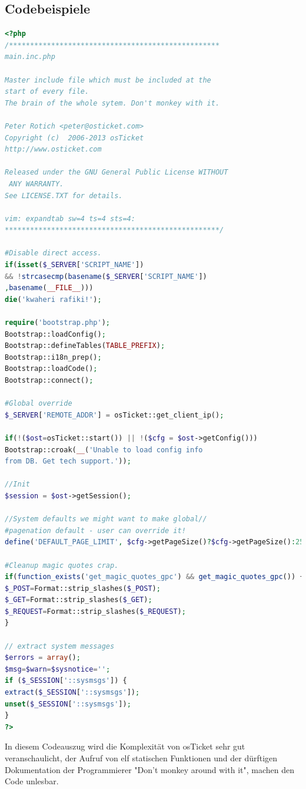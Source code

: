 \subsection{Codebeispiele}
\begin{lstlisting}[language=PHP, caption=Auszug aus osTicket, label=code:qj]
<?php
/**************************************************
main.inc.php

Master include file which must be included at the 
start of every file.
The brain of the whole sytem. Don't monkey with it.

Peter Rotich <peter@osticket.com>
Copyright (c)  2006-2013 osTicket
http://www.osticket.com

Released under the GNU General Public License WITHOUT
 ANY WARRANTY.
See LICENSE.TXT for details.

vim: expandtab sw=4 ts=4 sts=4:
***************************************************/

#Disable direct access.
if(isset($_SERVER['SCRIPT_NAME'])
&& !strcasecmp(basename($_SERVER['SCRIPT_NAME'])
,basename(__FILE__)))
die('kwaheri rafiki!');

require('bootstrap.php');
Bootstrap::loadConfig();
Bootstrap::defineTables(TABLE_PREFIX);
Bootstrap::i18n_prep();
Bootstrap::loadCode();
Bootstrap::connect();

#Global override
$_SERVER['REMOTE_ADDR'] = osTicket::get_client_ip();

if(!($ost=osTicket::start()) || !($cfg = $ost->getConfig()))
Bootstrap::croak(__('Unable to load config info 
from DB. Get tech support.'));

//Init
$session = $ost->getSession();

//System defaults we might want to make global//
#pagenation default - user can override it!
define('DEFAULT_PAGE_LIMIT', $cfg->getPageSize()?$cfg->getPageSize():25);

#Cleanup magic quotes crap.
if(function_exists('get_magic_quotes_gpc') && get_magic_quotes_gpc()) {
$_POST=Format::strip_slashes($_POST);
$_GET=Format::strip_slashes($_GET);
$_REQUEST=Format::strip_slashes($_REQUEST);
}

// extract system messages
$errors = array();
$msg=$warn=$sysnotice='';
if ($_SESSION['::sysmsgs']) {
extract($_SESSION['::sysmsgs']);
unset($_SESSION['::sysmsgs']);
}
?>

\end{lstlisting}
In diesem Codeauszug wird die Komplexität von osTicket sehr gut veranschaulicht, der Aufruf von elf statischen Funktionen und der dürftigen Dokumentation der Programmierer "Don't monkey around with it", machen den Code unlesbar.






